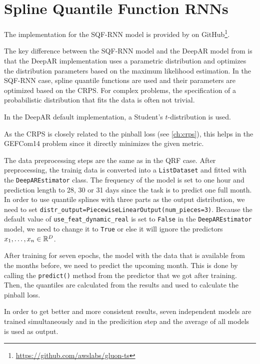 \section{Spline Quantile Function RNNs}
\label{sec:implementation-sqf-rnn}

The implementation for the SQF-RNN model is provided by 
\Textcite{Gasthaus2019} on GitHub\footnote{\url{https://github.com/awslabs/gluon-ts}}.

The key difference between the SQF-RNN model and the DeepAR model from 
\Textcite{Salinas2017} is that the DeepAR implementation uses a 
parametric distribution and optimizes the distribution parameters 
based on the maximum likelihood estimation. 
In the SQF-RNN case, spline quantile functions are used and their parameters 
are optimized based on the CRPS. 
For complex problems, the specification of a probabilistic distribution 
that fits the data is often not trivial. 

In the DeepAR default implementation, a Student's \(t\)-distribution is used. 

As the CRPS is closely related to the pinball loss (see \ref{ch:crps}), 
this helps in the GEFCom14 problem since it directly minimizes the given metric.

The data preprocessing steps are the same as in the QRF case. 
After preprocessing, the trainig data is converted into a \texttt{ListDataset} and fitted with the 
\texttt{DeepAREstimator} class. The frequency of the model is set to one hour and 
prediction length to 28, 30 or 31 days since the task is to predict one full month. 
In order to use quantile splines with three parts as the output distribution, 
we need to set \texttt{distr\_output=PiecewiseLinearOutput(num\_pieces=3)}. 
Because the default value of \texttt{use\_feat\_dynamic\_real} is set to \texttt{False} 
in the \texttt{DeepAREstimator} model, 
we need to change it to \texttt{True} or else it will ignore the predictors 
\(x_1, \ldots, x_n \in \mathbb{R}^D\). 

After training for seven epochs, the model with the data that is available from the months before, 
we need to predict the upcoming month. This is done by calling the \texttt{predict()} 
method from the predictor that we got after training.
Then, the quantiles are calculated from the results and used to 
calculate the pinball loss.

In order to get better and more consistent results, 
seven independent models are trained simultaneously and in the predicition step 
and the average of all models is used as output.

